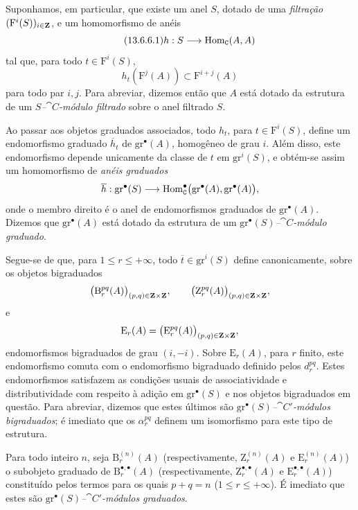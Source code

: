 \begin{env}[13.6.6]
\label{0.13.6.6}
Suponhamos, em particular, que existe um anel $S$, dotado de uma
\emph{filtração} $(\mathrm{F}^i(S))_{i\in\mathbf{Z}}$, e um homomorfismo
de anéis
\begin{equation}
\label{0.13.6.6.1}
\tag{13.6.6.1}
  h:S\longrightarrow\Hom_{\cat{C}}(A,A)
\end{equation}
tal que, para todo $t\in\mathrm{F}^i(S)$,
\[
  h_t(\mathrm{F}^j(A))
  \subset
  \mathrm{F}^{i+j}(A)
\]
para todo par $i,j$.
Para abreviar, dizemos então que $A$ está dotado da estrutura de um
\emph{$S$--$\cat{C}$-módulo filtrado} sobre o anel filtrado $S$.

Ao passar aos objetos graduados associados, todo $h_t$, para
$t\in\mathrm{F}^i(S)$, define um endomorfismo graduado
$\overline{h}_t$ de $\mathrm{gr}^\bullet(A)$, homogêneo de grau
$i$.
Além disso, este endomorfismo depende unicamente da classe de $t$ em
$\mathrm{gr}^i(S)$, e obtém-se assim um homomorfismo de
\emph{anéis graduados}
\[
  \overline{h}:
  \mathrm{gr}^\bullet(S)
  \longrightarrow
  \operatorname{Hom}_{\mathtt{C}}^\bullet
  \bigl(\mathrm{gr}^\bullet(A),\mathrm{gr}^\bullet(A)\bigr),
\]
onde o membro direito é o anel de endomorfismos graduados de
$\mathrm{gr}^\bullet(A)$.
Dizemos que $\mathrm{gr}^\bullet(A)$ está dotado da estrutura
de um \emph{$\mathrm{gr}^\bullet(S)$--$\cat{C}$-módulo graduado}.

Segue-se de  que, para
$1\leq r\leq+\infty$, todo
$\overline{t}\in\mathrm{gr}^i(S)$ define canonicamente, sobre os
objetos bigraduados
\[
  \bigl(\mathrm{B}_r^{pq}(A)\bigr)_{(p,q)\in\mathbf{Z}\times\mathbf{Z}},
  \qquad
  \bigl(\mathrm{Z}_r^{pq}(A)\bigr)_{(p,q)\in\mathbf{Z}\times\mathbf{Z}},
\]
e
\[
  \mathrm{E}_r(A)
  =
  \bigl(\mathrm{E}_r^{pq}(A)\bigr)_{(p,q)\in\mathbf{Z}\times\mathbf{Z}},
\]
endomorfismos bigraduados de grau $(i,-i)$.
Sobre $\mathrm{E}_r(A)$, para $r$ finito, este endomorfismo comuta com
o endomorfismo bigraduado definido pelos $d_r^{pq}$.
Estes endomorfismos satisfazem as condições usuais de associatividade e
distributividade com respeito à adição em
$\mathrm{gr}^\bullet(S)$ e nos objetos bigraduados em questão.
Para abreviar, dizemos que estes últimos são
\emph{$\mathrm{gr}^\bullet(S)$--$\cat{C}'$-módulos bigraduados};
é imediato que os $\alpha_r^{pq}$ definem um isomorfismo para
este tipo de estrutura.

Para todo inteiro $n$, seja $\mathrm{B}_r^{(n)}(A)$
(respectivamente, $\mathrm{Z}_r^{(n)}(A)$ e
$\mathrm{E}_r^{(n)}(A)$) o subobjeto graduado de
$\mathrm{B}_r^{\bullet,\bullet}(A)$
(respectivamente, $\mathrm{Z}_r^{\bullet,\bullet}(A)$ e
$\mathrm{E}_r^{\bullet,\bullet}(A)$) constituído pelos termos para
os quais $p+q=n$ ($1\leq r\leq+\infty$).
É imediato que estes são
\emph{$\mathrm{gr}^\bullet(S)$--$\cat{C}'$-módulos graduados}.


\end{env}
